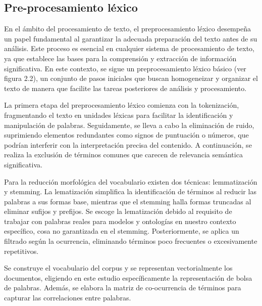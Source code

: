\subsection{Pre-procesamiento l\'exico}

En el ámbito del procesamiento de texto, el preprocesamiento léxico desempeña un papel fundamental al garantizar la adecuada preparación del texto antes de su análisis. Este proceso es esencial en cualquier sistema de procesamiento de texto, ya que establece las bases para la comprensión y extracción de información significativa. En este contexto, se sigue un preprocesamiento léxico básico (ver figura 2.2), un conjunto de pasos iniciales que buscan homogeneizar y organizar el texto de manera que facilite las tareas posteriores de análisis y procesamiento. 

La primera etapa del preprocesamiento léxico comienza con la tokenización, fragmentando el texto en unidades léxicas para facilitar la identificación y manipulación de palabras. Seguidamente, se lleva a cabo la eliminación de ruido, suprimiendo elementos redundantes como signos de puntuación o números, que podrían interferir con la interpretación precisa del contenido. A continuación, se realiza la exclusión de términos comunes que carecen de relevancia semántica significativa. 

Para la reducción morfológica del vocabulario existen dos t\'ecnicas: lemmatizaci\'on y stemming. La lematización simplifica la identificación de términos al reducir las palabras a sus formas base, mientras que el stemming halla formas truncadas al eliminar sufijos y prefijos. Se escoge la lematizaci\'on debido al requisito de trabajar con palabras reales para modelos y ontologías en nuestro contexto específico, cosa no garantizada en el stemming. Posteriormente, se aplica un filtrado según la ocurrencia, eliminando términos poco frecuentes o excesivamente repetitivos. 

Se construye el vocabulario del corpus y se representan vectorialmente los documentos, eligiendo en este estudio específicamente la representación de bolsa de palabras. Además, se elabora la matriz de co-ocurrencia de términos para capturar las correlaciones entre palabras.

